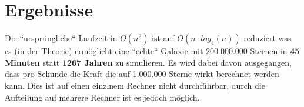 \section{Ergebnisse}

Die ``ursprüngliche`` Laufzeit in \( O(n^2) \) ist auf \( O(n \cdot log_4(n)) \)
reduziert was es (in der Theorie) ermöglicht eine ``echte`` Galaxie mit
200.000.000 Sternen in \textbf{45 Minuten} statt \textbf{1267 Jahren} zu
simulieren. Es wird dabei davon ausgegangen, dass pro Sekunde die Kraft die auf
1.000.000 Sterne wirkt berechnet werden kann. Dies ist auf einen einzlnem
Rechner nicht durchführbar, durch die Aufteilung auf mehrere Rechner ist es
jedoch möglich.
